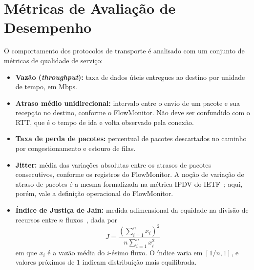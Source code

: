 \section{Métricas de Avaliação de Desempenho}
O comportamento dos protocolos de transporte é analisado com um conjunto de métricas de qualidade de serviço:
\begin{itemize}
    \item \textbf{Vazão (\textit{throughput}):} taxa de dados úteis entregues ao destino por unidade de tempo, em Mbps.
    \item \textbf{Atraso médio unidirecional:} intervalo entre o envio de um pacote e sua recepção no destino, conforme o FlowMonitor. Não deve ser confundido com o RTT, que é o tempo de ida e volta observado pela conexão.
    \item \textbf{Taxa de perda de pacotes:} percentual de pacotes descartados no caminho por congestionamento e estouro de filas.
    \item \textbf{Jitter:} média das variações absolutas entre os atrasos de pacotes consecutivos, conforme os registros do FlowMonitor. A noção de variação de atraso de pacotes é a mesma formalizada na métrica IPDV do IETF~\cite{rfc3393}; aqui, porém, vale a definição operacional do FlowMonitor.
    \item \textbf{Índice de Justiça de Jain:} medida adimensional da equidade na divisão de recursos entre $n$ fluxos~\cite{jain1984}, dada por
    \begin{equation}
        J = \frac{\left( \sum_{i=1}^{n} x_i \right)^2}{n \sum_{i=1}^{n} x_i^2}
    \end{equation}
    em que $x_i$ é a vazão média do $i$-ésimo fluxo. O índice varia em $[1/n, 1]$, e valores próximos de $1$ indicam distribuição mais equilibrada.
\end{itemize}
